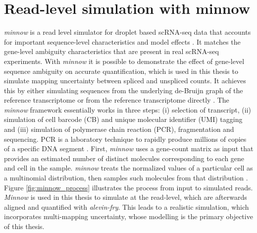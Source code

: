 \section{Read-level simulation with minnow}
\emph{minnow} is a read level simulator for droplet based scRNA-seq data that accounts for important sequence-level characteristics and model effects \citep{minnow}. It matches the gene-level ambiguity characteristics that are present in real scRNA-seq experiments. With \emph{minnow} it is possible to demonstrate the effect of gene-level sequence ambiguity on accurate quantification, which is used in this thesis to simulate mapping uncertainty between spliced and unspliced counts. It achieves this by either simulating sequences from the underlying de-Bruijn graph of the reference transcriptome or from the reference transcriptome directly \citep{minnow}. The \emph{minnow} framework essentially works in three steps: (i) selection of transcript, (ii) simulation of cell barcode (CB) and unique molecular identifier (UMI) tagging and (iii) simulation of polymerase chain reaction (PCR), fragmentation and sequencing. PCR is a laboratory technique to rapidly produce millions of copies of a specific DNA segment \citep{pcr}. First, \emph{minnow} uses a gene-count matrix as input that provides an estimated number of distinct molecules corresponding to each gene and cell in the sample. \emph{minnow} treats the normalized values of a particular cell as a multinomial distribution, then samples such molecules from that distribution \citep{minnow}. Figure \ref{fig:minnow_process} illustrates the process from input to simulated reads. \emph{Minnow} is used in this thesis to simulate at the read-level, which are afterwards aligned and quantified with \emph{alevin-fry}. This leads to a realistic simulation, which incorporates multi-mapping uncertainty, whose modelling is the primary objective of this thesis.

